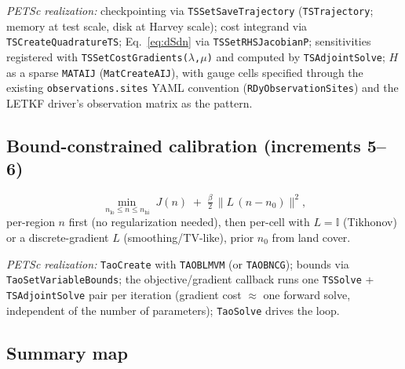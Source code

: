 \documentclass[11pt]{article}
\begin{document}
\emph{PETSc realization:} checkpointing via
\texttt{TSSetSaveTrajectory} (\texttt{TSTrajectory}; memory at test
scale, disk at Harvey scale); cost integrand via
\texttt{TSCreateQuadratureTS}; Eq.~\eqref{eq:dSdn} via
\texttt{TSSetRHSJacobianP}; sensitivities registered with
\texttt{TSSetCostGradients($\lambda$,$\mu$)} and computed by
\texttt{TSAdjointSolve}; $H$ as a sparse \texttt{MATAIJ}
(\texttt{MatCreateAIJ}), with gauge cells specified through the
existing \texttt{observations.sites} YAML convention
(\texttt{RDyObservationSites}) and the LETKF driver's observation
matrix as the pattern.

\subsection*{Bound-constrained calibration (increments 5--6)}

\begin{equation}
  \min_{\,n_{\mathrm{lo}} \le n \le n_{\mathrm{hi}}}\;
  J(n) \;+\; \tfrac{\beta}{2}\,\lVert L\,(n - n_0)\rVert^2,
  \label{eq:opt}
\end{equation}
per-region $n$ first (no regularization needed), then per-cell with
$L = \mathbb{I}$ (Tikhonov) or a discrete-gradient $L$
(smoothing/TV-like), prior $n_0$ from land cover.

\emph{PETSc realization:} \texttt{TaoCreate} with \texttt{TAOBLMVM} (or
\texttt{TAOBNCG}); bounds via \texttt{TaoSetVariableBounds}; the
objective/gradient callback runs one \texttt{TSSolve} +
\texttt{TSAdjointSolve} pair per iteration (gradient cost $\approx$ one
forward solve, independent of the number of parameters);
\texttt{TaoSolve} drives the loop.

\subsection*{Summary map}
\end{document}
